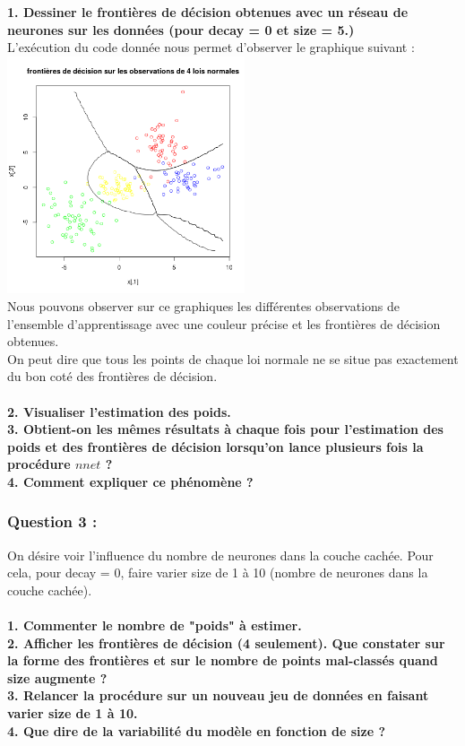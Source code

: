 \documentclass[a4paper, 10pt]{article}
\begin{document}
\textbf{1. Dessiner le frontières de décision obtenues avec un réseau de neurones sur les données (pour decay = 0 et size = 5.)}\\
L'exécution du code donnée nous permet d'observer le graphique suivant :\\
\includegraphics[height = 7cm, width = 7cm]{plots/frontiere_bayes_q1_1.png}\\
Nous pouvons observer sur ce graphiques les différentes observations de l'ensemble d'apprentissage avec une couleur précise et les frontières de décision obtenues.\\
On peut dire que tous les points de chaque loi normale ne se situe pas exactement du bon coté des frontières de décision.\\ \\
\textbf{2. Visualiser l'estimation des poids.}\\
\textbf{3. Obtient-on les mêmes résultats à chaque fois pour l'estimation des poids et des frontières de décision lorsqu'on lance plusieurs fois la procédure $nnet$ ?}\\
\textbf{4. Comment expliquer ce phénomène ?}\\

\subsubsection*{Question 3 :}

On désire voir l'influence du nombre de neurones dans la couche cachée. Pour cela, pour decay = 0, faire varier size de 1 à 10 (nombre de neurones dans la couche cachée).\\ \\

\textbf{1. Commenter le nombre de "poids" à estimer.}\\
\textbf{2. Afficher les frontières de décision (4 seulement). Que constater sur la forme des frontières et sur le nombre de points mal-classés quand size augmente ?}\\
\textbf{3. Relancer la procédure sur un nouveau jeu de données en faisant varier size de 1 à 10.}\\
\textbf{4. Que dire de la variabilité du modèle en fonction de size ?}\\
\end{document}
